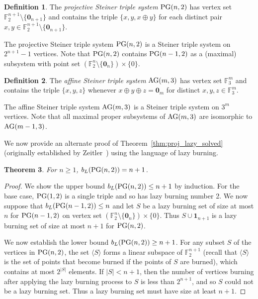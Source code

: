 \documentclass[12pt]{article}
\DeclareMathOperator{\PG}{\rm PG}
\DeclareMathOperator{\AG}{\rm AG}
\newtheorem{theorem}{Theorem}[section]
\theoremstyle{definition}
\newtheorem{definition}[theorem]{Definition}
\numberwithin{table}{section}
\begin{document}
\begin{definition}
    The \emph{projective Steiner triple system} $\PG(n,2)$ has vertex set $\mathbb{F}_2^{n+1}\setminus\{\mathbf{0}_{n+1}\}$ and contains the triple $\{x,y,x\oplus y\}$ for each distinct pair $x,y\in \mathbb{F}_2^{n+1}\setminus\{\mathbf{0}_{n+1}\}$. 
\end{definition}
The projective Steiner triple system $\PG(n,2)$ is a Steiner triple system on $2^{n+1}-1$ vertices. 
Note that $\PG(n,2)$ contains $\PG(n-1,2)$ as a (maximal) subsystem with point set $(\mathbb{F}_2^{n}\setminus\{\mathbf{0}_n\}) \times\{0\}$.

\begin{definition}
    The \emph{affine Steiner triple system} $\AG(m,3)$ has vertex set $\mathbb{F}_3^{m}$ and contains the triple $\{x,y,z\}$ whenever $x\oplus y\oplus z = \mathbf{0}_m$ for distinct $x,y,z\in \mathbb{F}_3^{m}$. 
\end{definition}

The affine Steiner triple system $\AG(m,3)$ is a Steiner triple system on $3^{m}$ vertices. Note that all maximal proper subsystems of $\AG(m,3)$ are isomorphic to $\AG(m-1,3)$.

\label{sec:Affine and Projective Geometries}






We now provide an alternate proof of Theorem~\ref{thm:proj_lazy_solved}
(originally established by Zeitler~\cite{Zeitler1987}) using the language of lazy burning.


{
\renewcommand{\thetheorem}{\ref{thm:proj_lazy_solved}}
\begin{theorem}
For $n\geq 1$,
$b_L(\PG(n,2))=n+1$.
\end{theorem}\addtocounter{theorem}{-1}
}


\begin{proof}
We show the upper bound $b_L(\PG(n,2))\le n+1$ by induction.
For the base case,  $\PG(1,2)$ is a single triple and so has lazy burning number 2.
We now suppose that $b_L(\PG(n-1,2))\le n$ and let $S$ be a lazy burning set of size at most $n$ for $\PG(n-1,2)$ on vertex set $(\mathbb{F}^{n}_2\setminus\{\mathbf{0}_n\})\times\{0\}$. Thus $S\cup \mathbf{1}_{n+1}$ is a lazy burning set of size at most $n+1$ for $\PG(n,2)$. 

We now establish the lower bound $b_L(\PG(n,2))\ge n+1$. 
For any subset $S$ of the vertices in $\PG(n,2)$, the set $\langle S\rangle$ forms a linear subspace of $\mathbb{F}_2^{n+1}$  (recall that $\langle S \rangle$ is the set of points that become burned if the points of $S$ are burned), which contains at most $2^{|S|}$ elements. 
If $|S|<n+1$, then the number of vertices burning after applying the lazy burning process to $S$ is less than $2^{n+1}$, and so $S$ could not be a lazy burning set. Thus a lazy burning set must have size at least $n+1$. 
\end{proof}
\end{document}
